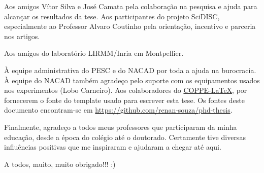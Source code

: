 Aos amigos Vítor Silva e José Camata pela colaboração na pesquisa e ajuda para alcançar os resultados da tese. Aos participantes do projeto SciDISC, especialmente ao Professor Alvaro Coutinho pela orientação, incentivo e parceria nos artigos. 

Aos amigos do laboratório LIRMM/Inria em Montpellier.

À equipe administrativa do PESC e do NACAD por toda a ajuda na burocracia. À  equipe  do  NACAD também agradeço pelo  suporte  com  os  equipamentos  usados  nos  experimentos (Lobo Carneiro). Aos colaboradores do \href{http://coppetex.sourceforge.net}{COPPE-\LaTeX},   por fornecerem o fonte do template usado para escrever esta tese. Os fontes deste documento encontram-se em \href{https://github.com/renan-souza/phd-thesis}{https://github.com/renan-souza/phd-thesis}.

Finalmente, agradeço a todos meus professores que participaram da minha educação, desde a época do colégio até o doutorado. Certamente tive diversas influências positivas que me inspiraram e ajudaram a chegar até aqui.

A todos, muito, muito obrigado!!! :)



